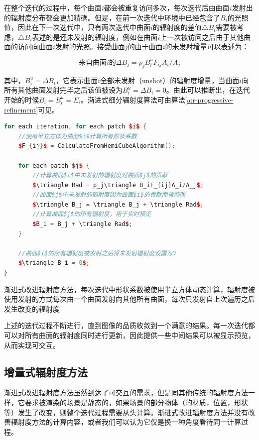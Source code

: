 在整个迭代的过程中，每个曲面$i$都会被重复访问多次，每次迭代后由曲面$i$发射出的辐射度分布都会更加精确。但是，在前一次迭代中环境中已经包含了$B_i$的光照值，因此在下一次迭代中，只有两次迭代中曲面$i$的辐射度的差值$\triangle B_i$需要被考虑，$\triangle B_i$表述的是还未发射的辐射度，例如在曲面$i$上一次被访问之后由于其他曲面的访问向曲面$i$发射的光照。接受曲面$j$的由于曲面$i$的未发射增量可以表述为：

\begin{equation}\label{e:r-shooting}
	\text{来自曲面$i$的}\Delta B_j=\rho_j B^{u}_i F_{ij}A_i/A_j
\end{equation}

\noindent 其中，$B^{u}_i=\Delta B_i$，它表示曲面$i$全部未发射（unshot）的辐射度增量，当曲面$i$向所有其他曲面发射完毕之后该值被设为$B^{u}_i=\Delta B_i=0$。由此可以推断出，在迭代开始的时候$B_i=B^{u}_i=E_i$。渐进式细分辐射度算法可由算法\ref{a:r-progressive-refinement}可见。

\begin{algorithm}
\begin{lstlisting}[language=C++, mathescape]
for each iteration, for each patch $i$ {
	//使用半立方体为曲面$i$计算所有形状系数
	$F_{ij}$ = CalculateFromHemiCubeAlgorithm();
	
	for each patch $j$ {
		//计算曲面$i$中未发射的辐射度对曲面$j$的贡献
		$\triangle Rad = p_j\triangle B_iF_{ij}A_i/A_j$;
		//曲面$j$中未发射的辐射度因为曲面$i$的贡献而被修改
		$\triangle B_j = \triangle B_j + \triangle Rad$; 
		//计算曲面$j$的所有辐射度，用于实时预览
		$B_i = B_j + \triangle Rad$; 
	}
	
	//曲面$i$的所有辐射度被发射之后将未发射辐射度设置为0
	$\triangle B_i = 0$; 
}
\end{lstlisting}
\caption{渐进式改进辐射度方法，每次迭代中形状系数被使用半立方体动态计算，辐射度被使用发射的方式每次由一个曲面发射向其他所有曲面，每次只发射自上次遍历之后发生改变的辐射度}
\label{a:r-progressive-refinement}
\end{algorithm}

上述的迭代过程不断进行，直到图像的品质收敛到一个满意的结果。每一次迭代都可以对所有曲面的辐射度同时进行更新，因此提供一些中间结果可以被显示预览，从而实现可交互。





\subsection{增量式辐射度方法}\label{sec:r-incremental-radiosity}
渐进式改进辐射度方法虽然到达了可交互的需求，但是同其他传统的辐射度方法一样，它要求被渲染的场景是静态的，如果场景的部分物体（的材质，位置，形状等）发生了改变，则整个迭代过程需要从头计算。渐进式改进辐射度方法并没有改善辐射度方法的计算内容，或者我们可以认为它仅是换一种角度看待同一计算过程。

